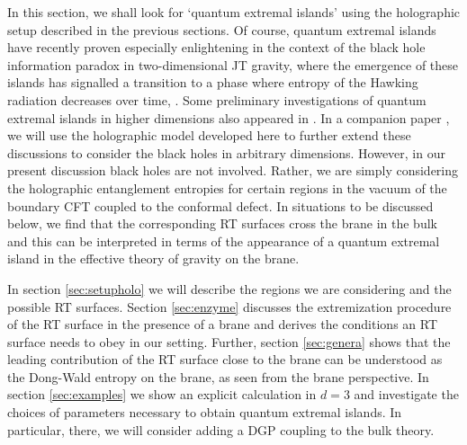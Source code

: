 
In this section, we shall look for `quantum extremal islands' using the holographic setup described in the previous sections. Of course, quantum extremal islands have recently proven especially enlightening in the context of the black hole information paradox in two-dimensional JT gravity, where the emergence of these islands has signalled a transition to a phase where entropy of the Hawking radiation decreases over time, \eg \cite{Almheiri:2019psf, Almheiri:2019hni, Almheiri:2019yqk, Chen:2019uhq, Penington:2019kki, Almheiri:2019qdq, Chen:2019iro}. Some preliminary investigations of quantum extremal islands in higher dimensions also appeared in \cite{Penington:2019npb,Almheiri:2019psy}. In a companion paper \cite{QEI}, we will use the holographic model developed here to further extend these discussions to consider the black holes in arbitrary dimensions. However, in our present discussion black holes are not involved. Rather, we are simply considering the holographic entanglement entropies for certain regions in the vacuum of the boundary CFT coupled to the conformal defect. In situations to be discussed below, we find that the corresponding RT surfaces cross the brane in the bulk and this can be interpreted in terms of the appearance of a quantum extremal island in the effective theory of gravity on the brane.

In section \ref{sec:setupholo} we will describe the regions we are considering and the possible RT surfaces. Section \ref{sec:enzyme} discusses the extremization procedure of the RT surface in the presence of a brane and derives the conditions an RT surface needs to obey in our setting. Further, section \ref{sec:genera} shows that the leading contribution of the RT surface close to the brane can be understood as the Dong-Wald entropy on the brane, as seen from the brane perspective. In section \ref{sec:examples} we show an explicit calculation in $d=3$ and investigate the choices of parameters necessary to obtain quantum extremal islands. In particular, there, we will consider adding a DGP coupling to the bulk theory.


